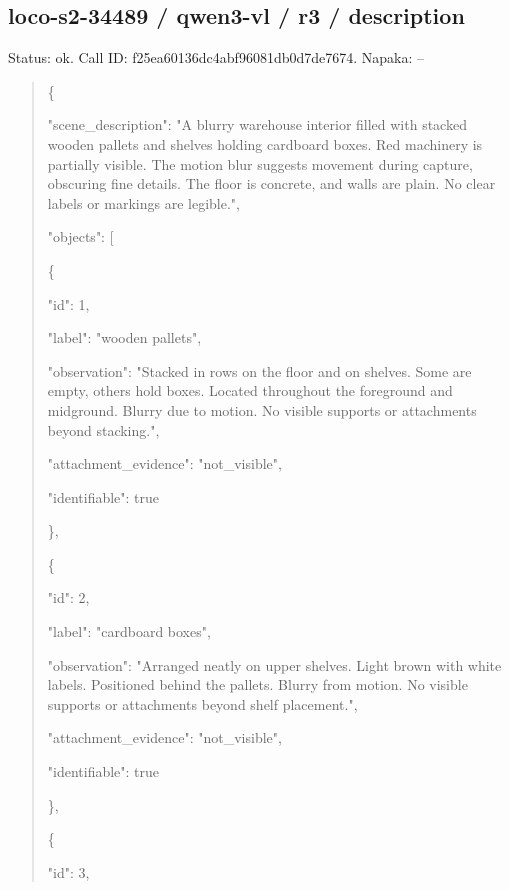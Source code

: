 \documentclass[10pt,a4paper]{article}
\begin{document}
\subsection*{loco-s2-34489 / qwen3-vl / r3 / description}
Status: ok. Call ID: f25ea60136dc4abf96081db0d7de7674. Napaka: --
\begin{quote}\footnotesize
\{\par
  "scene\_description":\allowbreak{} "A blurry warehouse interior filled with stacked wooden pallets and shelves holding cardboard boxes. Red machinery is partially visible. The motion blur suggests movement during capture,\allowbreak{} obscuring fine details. The floor is concrete,\allowbreak{} and walls are plain. No clear labels or markings are legible.",\allowbreak{}\par
  "objects":\allowbreak{} [\par
    \{\par
      "id":\allowbreak{} 1,\allowbreak{}\par
      "label":\allowbreak{} "wooden pallets",\allowbreak{}\par
      "observation":\allowbreak{} "Stacked in rows on the floor and on shelves. Some are empty,\allowbreak{} others hold boxes. Located throughout the foreground and midground. Blurry due to motion. No visible supports or attachments beyond stacking.",\allowbreak{}\par
      "attachment\_evidence":\allowbreak{} "not\_visible",\allowbreak{}\par
      "identifiable":\allowbreak{} true\par
    \},\allowbreak{}\par
    \{\par
      "id":\allowbreak{} 2,\allowbreak{}\par
      "label":\allowbreak{} "cardboard boxes",\allowbreak{}\par
      "observation":\allowbreak{} "Arranged neatly on upper shelves. Light brown with white labels. Positioned behind the pallets. Blurry from motion. No visible supports or attachments beyond shelf placement.",\allowbreak{}\par
      "attachment\_evidence":\allowbreak{} "not\_visible",\allowbreak{}\par
      "identifiable":\allowbreak{} true\par
    \},\allowbreak{}\par
    \{\par
      "id":\allowbreak{} 3,\allowbreak{}\par

\end{quote}
\end{document}
